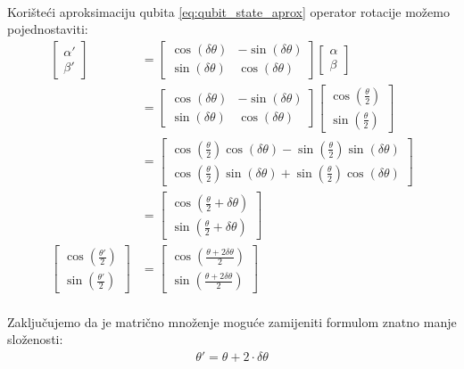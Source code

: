 \documentclass[times, utf8, zavrsni, numeric]{fer}
\begin{document}
\paragraph{}
Korišteći aproksimaciju qubita \ref{eq:qubit_state_aprox} operator rotacije možemo pojednostaviti:
\begin{align*}
\begin{bmatrix}
\alpha' \\ \beta'
\end{bmatrix}
&=
\begin{bmatrix}
\cos(\delta\theta) & -\sin(\delta\theta) \\ \sin(\delta\theta) & \cos(\delta\theta)
\end{bmatrix}
\begin{bmatrix}
\alpha \\ \beta
\end{bmatrix}
\\&=
\begin{bmatrix}
\cos(\delta\theta) & -\sin(\delta\theta) \\ \sin(\delta\theta) & \cos(\delta\theta)
\end{bmatrix}
\begin{bmatrix}
\cos(\frac{\theta}{2}) \\ \sin(\frac{\theta}{2})
\end{bmatrix}
\\&=
\begin{bmatrix}
\cos(\frac{\theta}{2})\cos(\delta\theta) - \sin(\frac{\theta}{2})\sin(\delta\theta) \\ \cos(\frac{\theta}{2})\sin(\delta\theta) + \sin(\frac{\theta}{2})\cos(\delta\theta)
\end{bmatrix}
\\&=
\begin{bmatrix}
\cos(\frac{\theta}{2}+\delta\theta) \\ \sin(\frac{\theta}{2}+\delta\theta)
\end{bmatrix} 
\\
\begin{bmatrix}
\cos(\frac{\theta'}{2}) \\ \sin(\frac{\theta'}{2})
\end{bmatrix}
&=
\begin{bmatrix}
\cos(\frac{\theta+2\delta\theta}{2}) \\ \sin(\frac{\theta+2\delta\theta}{2})
\end{bmatrix}
\end{align*}

\paragraph{}
Zaključujemo da je matrično množenje moguće zamijeniti formulom znatno manje složenosti:
\begin{align} \label{eq:qrot_simple}
\theta' = \theta + 2\cdot \delta\theta
\end{align}
\end{document}
